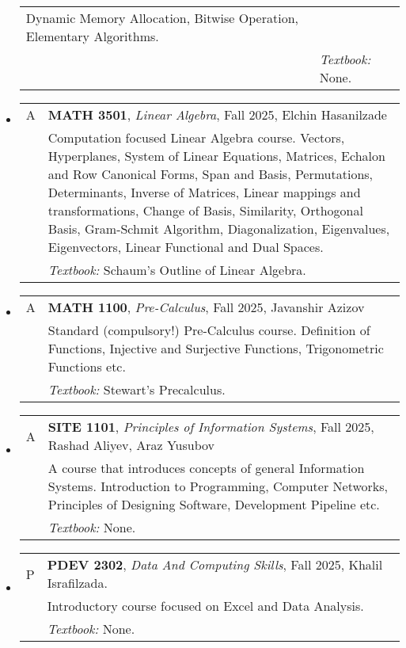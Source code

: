 \documentclass[12pt]{article}
\begin{document}
\begin{itemize}[leftmargin = *]
\begin{tabularx}{\textwidth}{@{}lX@{}}
            Dynamic Memory Allocation, Bitwise Operation, Elementary Algorithms.
            \\
            & \textit{Textbook:} None.
        \end{tabularx}
    \item[]
        \begin{tabularx}{\textwidth}{@{}lX@{}}
            A & \textbf{MATH 3501}, \textit{Linear Algebra}, Fall 2025, Elchin Hasanilzade
            \\
            & Computation focused Linear Algebra course. Vectors, Hyperplanes, System of Linear Equations, Matrices, Echalon and Row
            Canonical Forms, Span and Basis, Permutations, Determinants, Inverse of Matrices, Linear mappings and transformations, Change of Basis,
            Similarity, Orthogonal Basis, Gram-Schmit Algorithm, Diagonalization, Eigenvalues, Eigenvectors, Linear Functional and Dual Spaces.
            \\
            & \textit{Textbook:} Schaum's Outline of Linear Algebra.
        \end{tabularx}
    \item[]
        \begin{tabularx}{\textwidth}{@{}lX@{}}
            A & \textbf{MATH 1100}, \textit{Pre-Calculus}, Fall 2025, Javanshir Azizov
            \\
            & Standard (compulsory!) Pre-Calculus course. Definition of Functions, Injective and Surjective Functions, Trigonometric Functions etc.
            \\
            & \textit{Textbook:} Stewart's Precalculus.
        \end{tabularx}
    \item[]
        \begin{tabularx}{\textwidth}{@{}lX@{}}
            A & \textbf{SITE 1101}, \textit{Principles of Information Systems}, Fall 2025, Rashad Aliyev, Araz Yusubov
            \\
            & A course that introduces concepts of general Information Systems. Introduction to Programming, Computer Networks, Principles
            of Designing Software, Development Pipeline etc.
            \\
            & \textit{Textbook:} None.
        \end{tabularx}
    \item[]
        \begin{tabularx}{\textwidth}{@{}lX@{}}
            P & \textbf{PDEV 2302}, \textit{Data And Computing Skills}, Fall 2025, Khalil Israfilzada.

            \\
            & Introductory course focused on Excel and Data Analysis.
            \\
            & \textit{Textbook:} None.
        \end{tabularx}
\end{itemize}
\end{document}
